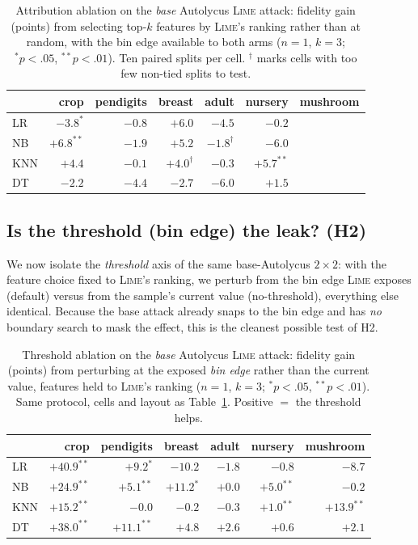 \documentclass[sigconf,anonymous,review]{acmart}
\begin{document}
\begin{table}[t]
\centering
\caption{Attribution ablation on the \emph{base} Autolycus \textsc{Lime} attack: fidelity gain (points) from selecting top-$k$
features by \textsc{Lime}'s ranking rather than at random, with the bin edge available to both arms
($n{=}1$, $k{=}3$; $^{*}p{<}.05$, $^{**}p{<}.01$). Ten paired splits per cell. $^{\dag}$ marks cells
with too few non-tied splits to test.}
\label{tab:lime-attr}
\begin{tabular}{lrrrrrr}
\toprule
 & crop & pendigits & breast & adult & nursery & mushroom \\
\midrule
LR  & $-3.8^{*}$  & $-0.8$ & $+6.0$      & $-4.5$        & $-0.2$      & \\
NB  & $+6.8^{**}$ & $-1.9$ & $+5.2$      & $-1.8^{\dag}$ & $-6.0$      & \\
KNN & $+4.4$      & $-0.1$ & $+4.0^{\dag}$ & $-0.3$      & $+5.7^{**}$ & \\
DT  & $-2.2$      & $-4.4$ & $-2.7$      & $-6.0$        & $+1.5$      & \\
\bottomrule
\end{tabular}
\end{table}

\subsection{Is the threshold (bin edge) the leak? (H2)}
\label{subsec:e3}
We now isolate the \emph{threshold} axis of the same base-Autolycus $2{\times}2$: with the feature
choice fixed to \textsc{Lime}'s ranking, we perturb from the bin edge \textsc{Lime} exposes (default)
versus from the sample's current value (no-threshold), everything else identical. Because the base
attack already snaps to the bin edge and has \emph{no} boundary search to mask the effect, this is
the cleanest possible test of H2.

\begin{table}[t]
\centering
\caption{Threshold ablation on the \emph{base} Autolycus \textsc{Lime} attack: fidelity gain (points) from perturbing at the
exposed \emph{bin edge} rather than the current value, features held to \textsc{Lime}'s ranking
($n{=}1$, $k{=}3$; $^{*}p{<}.05$, $^{**}p{<}.01$). Same protocol, cells and layout as
Table~\ref{tab:lime-attr}. Positive $=$ the threshold helps.}
\label{tab:lime-threshold}
\begin{tabular}{lrrrrrr}
\toprule
 & crop & pendigits & breast & adult & nursery & mushroom \\
\midrule
LR  & $+40.9^{**}$ & $+9.2^{*}$   & $-10.2$     & $-1.8$ & $-0.8$      & $-8.7$ \\
NB  & $+24.9^{**}$ & $+5.1^{**}$  & $+11.2^{*}$ & $+0.0$ & $+5.0^{**}$ & $-0.2$ \\
KNN & $+15.2^{**}$ & $-0.0$       & $-0.2$      & $-0.3$ & $+1.0^{**}$ & $+13.9^{**}$ \\
DT  & $+38.0^{**}$ & $+11.1^{**}$ & $+4.8$      & $+2.6$ & $+0.6$      & $+2.1$ \\
\bottomrule
\end{tabular}
\end{table}
\end{document}

